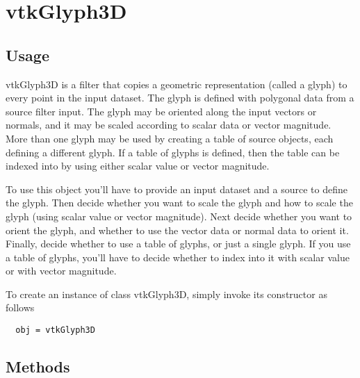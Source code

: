 \section{vtkGlyph3D}

\subsection{Usage}

 vtkGlyph3D is a filter that copies a geometric representation (called
 a glyph) to every point in the input dataset. The glyph is defined with
 polygonal data from a source filter input. The glyph may be oriented
 along the input vectors or normals, and it may be scaled according to
 scalar data or vector magnitude. More than one glyph may be used by
 creating a table of source objects, each defining a different glyph. If a
 table of glyphs is defined, then the table can be indexed into by using
 either scalar value or vector magnitude.
 
 To use this object you'll have to provide an input dataset and a source
 to define the glyph. Then decide whether you want to scale the glyph and
 how to scale the glyph (using scalar value or vector magnitude). Next
 decide whether you want to orient the glyph, and whether to use the
 vector data or normal data to orient it. Finally, decide whether to use a
 table of glyphs, or just a single glyph. If you use a table of glyphs,
 you'll have to decide whether to index into it with scalar value or with
 vector magnitude.
 

To create an instance of class vtkGlyph3D, simply
invoke its constructor as follows
\begin{verbatim}
  obj = vtkGlyph3D
\end{verbatim}
\subsection{Methods}


